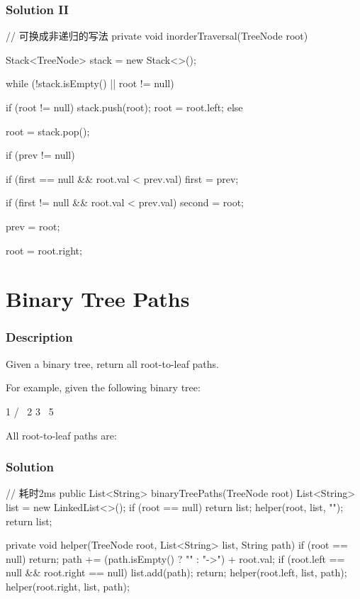 \subsubsection{Solution II}
\begin{Code}
// 可换成非递归的写法
private void inorderTraversal(TreeNode root) {
    Stack<TreeNode> stack = new Stack<>();

    while (!stack.isEmpty() || root != null) {
        if (root != null) {
            stack.push(root);
            root = root.left;
        } else {
            root = stack.pop();

            if (prev != null) {
                if (first == null && root.val < prev.val) {
                    first = prev;
                }

                if (first != null && root.val < prev.val) {
                    second = root;
                }
            }

            prev = root;

            root = root.right;
        }
    }
}
\end{Code}

\newpage

\section{Binary Tree Paths} %

\subsubsection{Description}
Given a binary tree, return all root-to-leaf paths.

For example, given the following binary tree:
\begin{Code}
   1
 /   \
2     3
 \
  5
\end{Code}

All root-to-leaf paths are:

\code{["1->2->5", "1->3"]}

\subsubsection{Solution}

\begin{Code}
// 耗时2ms
public List<String> binaryTreePaths(TreeNode root) {
    List<String> list = new LinkedList<>();
    if (root == null) {
        return list;
    }
    helper(root, list, "");
    return list;
}

private void helper(TreeNode root, List<String> list, String path) {
    if (root == null) {
        return;
    }
    path += (path.isEmpty() ? "" : "->") + root.val;
    if (root.left == null && root.right == null) {
        list.add(path);
        return;
    }
    helper(root.left, list, path);
    helper(root.right, list, path);
}
\end{Code}

